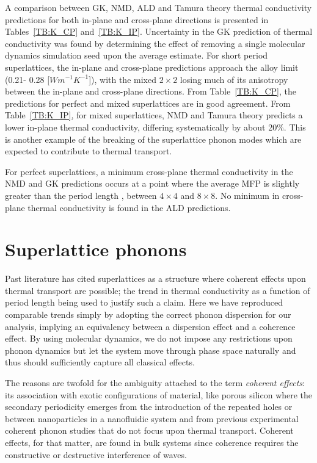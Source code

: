 A comparison between GK, NMD, ALD and Tamura theory thermal conductivity predictions for both in-plane and cross-plane directions is presented in Tables~\ref{TB:K_CP} and~\ref{TB:K_IP}. Uncertainty in the GK prediction of thermal conductivity was found by determining the effect of removing a single molecular dynamics simulation seed upon the average estimate. For short period superlattices, the in-plane and cross-plane predictions approach the alloy limit (0.21- 0.28 [$Wm^{-1}K^{-1}$]), with the mixed $2\times 2$ losing much of its anisotropy between the in-plane and cross-plane directions. From Table~\ref{TB:K_CP}, the predictions for perfect and mixed superlattices are in good agreement. From Table~\ref{TB:K_IP}, for mixed superlattices, NMD and Tamura theory predicts a lower in-plane thermal conductivity, differing systematically by about 20\%. This is another example of the breaking of the superlattice phonon modes which are expected to contribute to thermal transport.

For perfect superlattices, a minimum cross-plane thermal conductivity in the NMD and GK predictions occurs at a point where the average MFP is slightly greater than the period length \cite{PhysRevLett.84.927}, between $4 \times 4$ and $8 \times 8$. No minimum in cross-plane thermal conductivity is found in the ALD predictions.

\section{Superlattice phonons}

Past literature has cited superlattices as a structure where coherent effects upon thermal transport are possible; the trend in thermal conductivity as a function of period length being used to justify such a claim.\cite{PhysRevB.67.195311,PhysRevB.72.174302,PhysRevB.61.3091} Here we have reproduced comparable trends simply by adopting the correct phonon dispersion for our analysis, implying an equivalency between a dispersion effect and a coherence effect. By using molecular dynamics, we do not impose any restrictions upon phonon dynamics but let the system move through phase space naturally and thus should sufficiently capture all classical effects. 

The reasons are twofold for the ambiguity attached to the term \textit {coherent effects}: its association with exotic configurations of material, like porous silicon \cite{doi:10.1021/nl102918q} where the secondary periodicity emerges from the introduction of the repeated holes or between nanoparticles in a nanofluidic system \cite{Keblinski2002855} and from previous experimental coherent phonon studies \cite{PhysRevLett.73.740,PhysRevB.75.195309} that do not focus upon thermal transport. Coherent effects, for that matter, are found in bulk systems since coherence requires the constructive or destructive interference of waves.

